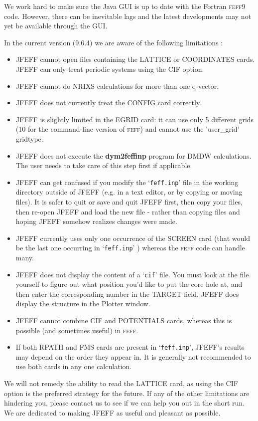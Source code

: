 \documentclass[11pt,oneside]{report} %
\newcommand{\program}[1]{\textsc{#1}}
\newcommand{\feff}{\program{feff}}
\newcommand{\vnum}{9}
\newcommand{\feffcur}{\feff\vnum}
\newcommand{\file}[1]{`\texttt{#1}'}
\newcommand{\module}[1]{\textrm{\bf{#1}}}
\begin{document}
We work hard to make sure the Java GUI is up to date with the Fortran {\feffcur} code.  However, there can be inevitable lags and the latest developments may not yet be available through the GUI.

In the current version (9.6.4) we are aware of the following limitations :
\begin{itemize}  \tightlist
\item  JFEFF cannot open files containing the LATTICE or COORDINATES cards.  JFEFF can only treat periodic systems using the CIF option.
\item  JFEFF cannot do NRIXS calculations for more than one q-vector.
\item  JFEFF does not currently treat the CONFIG card correctly.
\item  JFEFF is slightly limited in the EGRID card: it can use only 5 different grids (10 for the command-line version of {\feff}) and cannot use the 'user\_grid' gridtype.
\item  JFEFF does not execute the \module{dym2feffinp} program for DMDW calculations.  The user needs to take care of this step first if applicable.
\item  JFEFF can get confused if you modify the \file{feff.inp} file in the working directory outside of JFEFF (e.g. in a text editor, or by copying or moving files).  It is safer to quit or save and quit JFEFF first, then copy your files, then re-open JFEFF and load the new file - rather than copying files and hoping JFEFF somehow realizes changes were made.
\item  JFEFF currently uses only one occurrence of the SCREEN card (that would be the last one occurring in \file{feff.inp} ) whereas the {\feff} code can handle many.
\item  JFEFF does not display the content of a \file{cif} file.  You must look at the file yourself to figure out what position you'd like to put the core hole at, and then enter the corresponding number in the TARGET field.  JFEFF does display the structure in the Plotter window.
\item  JFEFF cannot combine CIF and POTENTIALS cards, whereas this is possible (and sometimes useful) in {\feff}.
\item If both RPATH and FMS cards are present in \file{feff.inp}, JFEFF's results may depend on the order they appear in.  It is generally not recommended to use both cards in any one calculation.
\end{itemize}

We will not remedy the ability to read the LATTICE card, as using the CIF option is the preferred strategy for the future.  If any of the other limitations are hindering you, please contact us to see if we can help you out in the short run.  We are dedicated to making JFEFF as useful and pleasant as possible.
\end{document}
